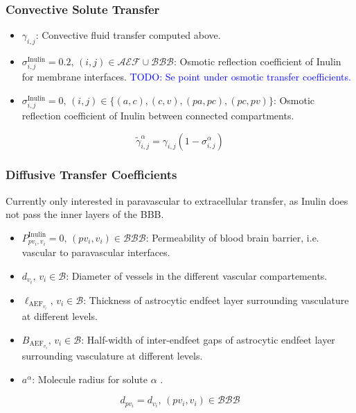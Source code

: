 \documentclass{article}
\theoremstyle{definition}
\theoremstyle{plain}
\theoremstyle{remark}
\newcommand{\TODO}[1]{\textcolor{blue}{TODO: #1}}
\begin{document}
\subsubsection*{Convective Solute Transfer}
\begin{itemize}
    \item $\gamma_{i,j} $: Convective fluid transfer computed above.
    \item $\sigma_{i, j}^{\text{Inulin}} = 0.2, \, (i, j) \in \mathcal{AEF}\cup\mathcal{BBB}$: Osmotic reflection coefficient of Inulin for membrane interfaces.
        \TODO{Se point under osmotic transfer coefficients.}
    \item $\sigma_{i, j}^{\text{Inulin}} = 0, \, (i, j) \in \{(a, c), (c, v), (pa, pc), (pc, pv)\} $: Osmotic reflection coefficient of Inulin between connected compartments.
\end{itemize}
\begin{equation}
    \tilde\gamma_{i, j}^\alpha = \gamma_{i, j}\left(1 - \sigma^\alpha_{i, j}\right)
\end{equation}

\subsubsection*{Diffusive Transfer Coefficients}
Currently only interested in paravascular to extracellular transfer, as Inulin does not pass the inner layers of the BBB.
\begin{itemize}
    \item $P^\text{Inulin}_{pv_i, v_i} = 0, \, (pv_i, v_i) \in \mathcal{BBB}$: Permeability of blood brain barrier, i.e. vascular to paravascular interfaces.
    \item $d_{v_i}, \, v_i \in \mathcal{B}$: Diameter of vessels in the different vascular compartements.
    \item $\ell_{\text{AEF}_{v_i}}, \, v_i \in \mathcal{B} $: Thickness of astrocytic endfeet layer surrounding vasculature at different levels.
    \item $ B_{\text{AEF}_{v_i}}, \, v_i \in \mathcal{B}$: Half-width of inter-endfeet gaps of astrocytic endfeet layer surrounding vasculature at different levels.
    \item $a^\alpha$: Molecule radius for solute \( \alpha \) .
\end{itemize}

\begin{equation}
    d_{pv_i} = d_{v_i}, \, (pv_i, v_i) \in \mathcal{BBB}
\label{eq: paravascular diameter} 
\end{equation}
\end{document}
